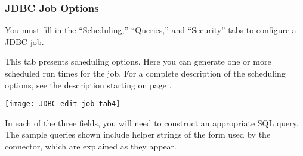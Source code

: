 %
%

\subsubsection{JDBC Job Options}

You must fill in the ``Scheduling,'' ``Queries,'' and ``Security''
tabs to configure a JDBC job.


\ifJDBCGuide

\fi

\ifCombinedConnectorGuide
This tab presents scheduling options. Here you can generate one or
more scheduled run times for the job. For a complete description of
the scheduling options, see the description starting on page
\pageref{scheduling}.
\fi

\texttt{[image: JDBC-edit-job-tab4]}

In each of the three fields, you will need to construct an appropriate
SQL query. The sample queries shown include helper strings of the form
 used by the connector, which are explained as they
appear.

